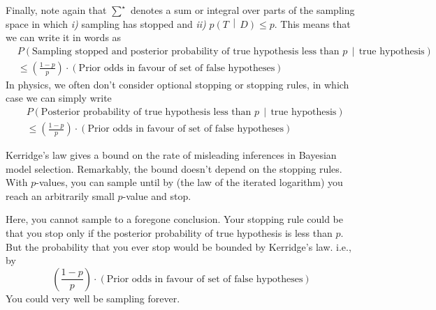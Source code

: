 \documentclass[12pt]{article}
\newcommand{\given}{\, \middle| \,}
\newcommand{\Prob}[2]{P\left(#1 \given #2 \right)}
\newcommand{\prob}[2]{p\left(#1 \given #2 \right)}
\begin{document}
Finally, note again that $\sum^\star$ denotes a sum or integral over parts of the sampling space in which \emph{i)} sampling has stopped and \emph{ii)} $\prob{T}{D} \le p$. This means that we can write it in words as
\begin{equation}
\begin{split}
&\Prob{\text{Sampling stopped and posterior probability of true hypothesis less than $p$}}{\text{true hypothesis}} \\
&\le \left(\frac{1 - p}{p}\right) \cdot (\text{Prior odds in favour of set of false hypotheses})
\end{split}
\end{equation}
In physics, we often don't consider optional stopping or stopping rules, in which case we can simply write
\begin{equation}
\begin{split}
&\Prob{\text{Posterior probability of true hypothesis less than $p$}}{\text{true hypothesis}} \\
&\le \left(\frac{1 - p}{p}\right) \cdot (\text{Prior odds in favour of set of false hypotheses})
\end{split}
\end{equation}

Kerridge's law gives a bound on the rate of misleading inferences in Bayesian model selection. Remarkably, the bound doesn't depend on the stopping rules. With $p$-values, you can sample until by (the law of the iterated logarithm) you reach an arbitrarily small $p$-value and stop. 

Here, you cannot sample to a foregone conclusion. Your stopping rule could be that you stop only if the posterior probability of true hypothesis is less than $p$. But the probability that you ever stop would be bounded by Kerridge's law. i.e., by 
\begin{equation}
\left(\frac{1 - p}{p}\right) \cdot (\text{Prior odds in favour of set of false hypotheses})
\end{equation}
You could very well be sampling forever.



\end{document}
